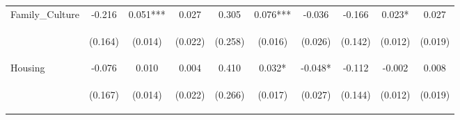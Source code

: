 \begin{tabular}{lccccccccc}
\noalign{\smallskip}Family_Culture & -0.216 & 0.051*** & 0.027 & 0.305 & 0.076*** & -0.036 & -0.166 & 0.023* & 0.027\\
 & \begin{footnotesize}(0.164)\end{footnotesize} & \begin{footnotesize}(0.014)\end{footnotesize} & \begin{footnotesize}(0.022)\end{footnotesize} & \begin{footnotesize}(0.258)\end{footnotesize} & \begin{footnotesize}(0.016)\end{footnotesize} & \begin{footnotesize}(0.026)\end{footnotesize} & \begin{footnotesize}(0.142)\end{footnotesize} & \begin{footnotesize}(0.012)\end{footnotesize} & \begin{footnotesize}(0.019)\end{footnotesize}\\
\noalign{\smallskip}Housing & -0.076 & 0.010 & 0.004 & 0.410 & 0.032* & -0.048* & -0.112 & -0.002 & 0.008\\
 & \begin{footnotesize}(0.167)\end{footnotesize} & \begin{footnotesize}(0.014)\end{footnotesize} & \begin{footnotesize}(0.022)\end{footnotesize} & \begin{footnotesize}(0.266)\end{footnotesize} & \begin{footnotesize}(0.017)\end{footnotesize} & \begin{footnotesize}(0.027)\end{footnotesize} & \begin{footnotesize}(0.144)\end{footnotesize} & \begin{footnotesize}(0.012)\end{footnotesize} & \begin{footnotesize}(0.019)\end{footnotesize}\\

\end{tabular}
